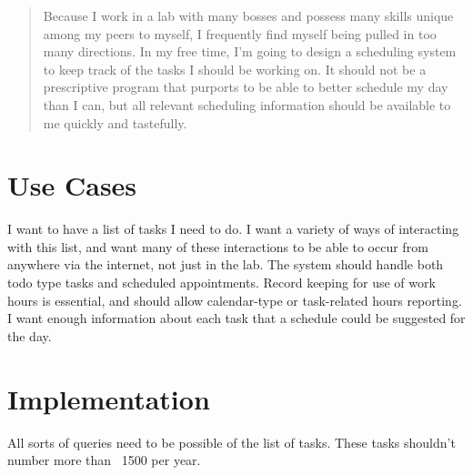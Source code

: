 \documentclass[12pt]{article}
\begin{document}
\maketitle

\begin{abstract}
Because I work in a lab with many bosses and possess many skills unique among my peers to myself,
I frequently find myself being pulled in too many directions.  In my free time, I'm going to
design a scheduling system to keep track of the tasks I should be working on.  It should not
be a prescriptive program that purports to be able to better schedule my day than I can, but
all relevant scheduling information should be available to me quickly and tastefully.
\end{abstract}

\section{Use Cases}
I want to have a list of tasks I need to do.  I want a variety of ways of interacting with this list,
and want many of these interactions to be able to occur from anywhere via the internet, not just in 
the lab.  The system should handle both todo type tasks and scheduled appointments.  Record keeping
for use of work hours is essential, and should allow calendar-type or task-related hours reporting.
I want enough information about each task that a schedule could be suggested for the day.

\section{Implementation}
All sorts of queries need to be possible of the list of tasks.  These tasks shouldn't number more
than ~1500 per year.
\end{document}
